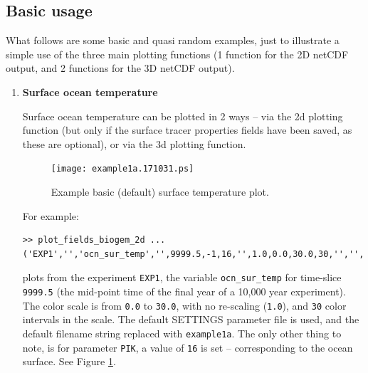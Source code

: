 \documentclass[11pt,fleqn]{book} %
\begin{document}

\subsection{Basic usage}

What follows are some basic and quasi random examples, just to illustrate a simple use of the three main plotting functions (1 function for the 2D netCDF output, and 2 functions for the 3D netCDF output).

\begin{enumerate}[noitemsep]

\vspace{4pt}
\item \textbf{Surface ocean temperature}

Surface ocean temperature can be plotted in 2 ways -- via the 2d plotting function (but only if the surface tracer properties fields have been saved, as these are optional), or via the 3d plotting function.

\begin{figure}[ht]
\begin{center}
\texttt{[image: example1a.171031.ps]}
\end{center}
\vspace{-11mm}
\caption{Example basic (default) surface temperature plot.}
\label{fig:example1a}
\end{figure}

For example:

\footnotesize
\vspace{-0pt}\begin{verbatim}
>> plot_fields_biogem_2d ...
('EXP1','','ocn_sur_temp','',9999.5,-1,16,'',1.0,0.0,30.0,30,'','','example1a');
\end{verbatim}\vspace{-0pt}
\normalsize
plots from the experiment \texttt{EXP1}, the variable \texttt{ocn\_sur\_temp} for time-slice \texttt{9999.5} (the mid-point time of the final year of a 10,000 year experiment). The color scale is from \texttt{0.0} to \texttt{30.0}, with no re-scaling (\texttt{1.0}), and \texttt{30} color intervals in the scale. The default \footnotesize\textsf{SETTINGS }\normalsize parameter file is used, and the default filename string replaced with \texttt{example1a}. The only other thing to note, is for parameter \texttt{PIK}, a value of \texttt{16} is set -- corresponding to the ocean surface. See Figure \ref{fig:example1a}.


\end{enumerate}
\end{document}
